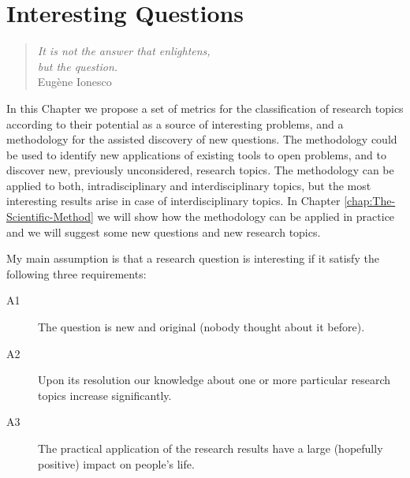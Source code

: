 %
%

%
%


\chapter{Interesting Questions}
\label{chap:Interesting-Research-Questions}

\begin{quote}
\begin{flushright}
\emph{It is not the answer that enlightens,\\
but the question. \\}
Eugène Ionesco
\end{flushright}
\end{quote}
\bigskip

In this Chapter we propose a set of metrics for the classification of research topics according to their potential as a source of interesting problems, and a methodology for the assisted discovery of new questions. The methodology could be used to identify new applications of existing tools to open problems, and to discover new, previously unconsidered, research topics. The methodology can be applied to both, intradisciplinary and interdisciplinary topics, but the most interesting results arise in case of interdisciplinary topics. In Chapter \ref{chap:The-Scientific-Method} we will show how the methodology can be applied in practice and we will suggest some new questions and new research topics.

My main assumption is that a research question is interesting if it satisfy the following three requirements:

\bigskip

\begin{description}
\item[A1] The question is new and original (nobody thought about it before).
\item[A2] Upon its resolution our knowledge about one or more particular research topics increase significantly.
\item[A3] The practical application of the research results have a large (hopefully positive) impact on people's life.
\end{description}

